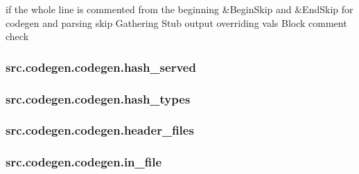 if the whole line is commented from the beginning \&Begin\-Skip and \&End\-Skip for codegen and parsing skip Gathering Stub output overriding vals Block comment check \hypertarget{classsrc_1_1codegen_1_1codegen_aeb496fa242e02add6763b1231c8d0d6b}{
\subsubsection[{hash\-\_\-served}]{\setlength{\rightskip}{0pt plus 5cm}src.\-codegen.\-codegen.\-hash\-\_\-served}}\label{classsrc_1_1codegen_1_1codegen_aeb496fa242e02add6763b1231c8d0d6b}
\hypertarget{classsrc_1_1codegen_1_1codegen_a7d558f65ce1c06aac95ff81ccf6d7c56}{
\subsubsection[{hash\-\_\-types}]{\setlength{\rightskip}{0pt plus 5cm}src.\-codegen.\-codegen.\-hash\-\_\-types}}\label{classsrc_1_1codegen_1_1codegen_a7d558f65ce1c06aac95ff81ccf6d7c56}
\hypertarget{classsrc_1_1codegen_1_1codegen_ab99ac25e057b9cc6007f411d7f7bb586}{
\subsubsection[{header\-\_\-files}]{\setlength{\rightskip}{0pt plus 5cm}src.\-codegen.\-codegen.\-header\-\_\-files}}\label{classsrc_1_1codegen_1_1codegen_ab99ac25e057b9cc6007f411d7f7bb586}
\hypertarget{classsrc_1_1codegen_1_1codegen_a924b875eb5083c8e386a7c511062ec54}{
\subsubsection[{in\-\_\-file}]{\setlength{\rightskip}{0pt plus 5cm}src.\-codegen.\-codegen.\-in\-\_\-file}}\label{classsrc_1_1codegen_1_1codegen_a924b875eb5083c8e386a7c511062ec54}
